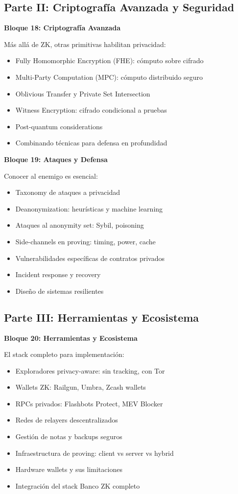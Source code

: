 \documentclass[11pt,a4paper,twoside]{book}
\theoremstyle{definition}
\theoremstyle{remark}
\begin{document}
\subsection*{Parte II: Criptografía Avanzada y Seguridad}

\textbf{Bloque 18: Criptografía Avanzada}

Más allá de ZK, otras primitivas habilitan privacidad:
\begin{itemize}
    \item Fully Homomorphic Encryption (FHE): cómputo sobre cifrado
    \item Multi-Party Computation (MPC): cómputo distribuido seguro
    \item Oblivious Transfer y Private Set Intersection
    \item Witness Encryption: cifrado condicional a pruebas
    \item Post-quantum considerations
    \item Combinando técnicas para defensa en profundidad
\end{itemize}

\textbf{Bloque 19: Ataques y Defensa}

Conocer al enemigo es esencial:
\begin{itemize}
    \item Taxonomy de ataques a privacidad
    \item Deanonymization: heurísticas y machine learning
    \item Ataques al anonymity set: Sybil, poisoning
    \item Side-channels en proving: timing, power, cache
    \item Vulnerabilidades específicas de contratos privados
    \item Incident response y recovery
    \item Diseño de sistemas resilientes
\end{itemize}

\subsection*{Parte III: Herramientas y Ecosistema}

\textbf{Bloque 20: Herramientas y Ecosistema}

El stack completo para implementación:
\begin{itemize}
    \item Exploradores privacy-aware: sin tracking, con Tor
    \item Wallets ZK: Railgun, Umbra, Zcash wallets
    \item RPCs privados: Flashbots Protect, MEV Blocker
    \item Redes de relayers descentralizados
    \item Gestión de notas y backups seguros
    \item Infraestructura de proving: client vs server vs hybrid
    \item Hardware wallets y sus limitaciones
    \item Integración del stack Banco ZK completo
\end{itemize}
\end{document}
